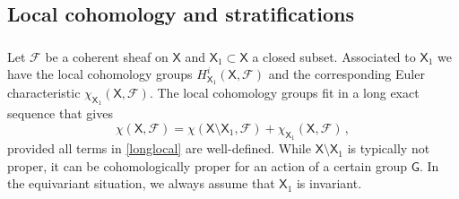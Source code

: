 \documentclass[14pt]{extarticle}
\newcommand{\bG}{\mathsf{G}}
\newcommand{\bX}{\mathsf{X}}
\newcommand{\cF}{\mathscr{F}}
\newcommand{\comp}{\textup{cmp}}
\DeclareMathOperator{\Ind}{Ind}
\newtheorem{Proposition}[Lemma]{Proposition}
\theoremstyle{definition}
\begin{document}










\subsection{Local cohomology and stratifications}\label{s_lc_s}

\subsubsection{}

Let $\cF$ be a coherent sheaf on $\bX$ and $\bX_1\subset \bX $ a closed
subset. Associated to $\bX_1$ we have the local cohomology groups
$H^i_{\bX_1}(\bX,\cF)$ and the corresponding Euler characteristic
$\chi_{\bX_1}(\bX,\cF)$. The local cohomology groups fit in a long exact sequence that gives
%
\begin{equation}
  \label{longlocal}
  \chi(\bX,\cF) = \chi(\bX \setminus \bX_1, \cF) + \chi_{\bX_1}(\bX, \cF) \,, 
\end{equation}
%
provided all terms in \eqref{longlocal} are well-defined. While 
$\bX\setminus \bX_1$ is typically not proper, it can be cohomologically
proper for an action of a certain group $\bG$. In the equivariant
situation, we always assume that $\bX_1$ is invariant.
\end{document}
